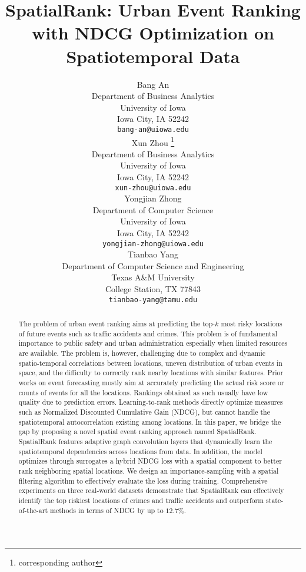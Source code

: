 \documentclass{article}
\title{SpatialRank: Urban Event Ranking with NDCG Optimization on Spatiotemporal Data}
\author{
  Bang An\\
  Department of Business Analytics\\
  University of Iowa\\
  Iowa City, IA 52242 \\
  \texttt{bang-an@uiowa.edu} \\
   \And
   Xun Zhou \thanks{corresponding author} \\
  Department of Business Analytics\\
  University of Iowa\\
  Iowa City, IA 52242 \\
  \texttt{xun-zhou@uiowa.edu} \\
   \AND
    Yongjian Zhong \\
  Department of Computer Science\\
  University of Iowa\\
  Iowa City, IA 52242 \\
  \texttt{yongjian-zhong@uiowa.edu} \\
   \And
  Tianbao Yang \\
  Department of Computer Science and Engineering\\
  Texas A\&M University\\
  College Station, TX 77843 \\
  \texttt{tianbao-yang@tamu.edu} 
}
\begin{document}
\maketitle


\begin{abstract}

The problem of urban event ranking aims at predicting the top-$k$ most risky locations of future events such as traffic accidents and crimes. This problem is of fundamental importance to public safety and urban administration especially when limited resources are available. The problem is, however, challenging due to complex and dynamic spatio-temporal correlations between locations, uneven distribution of urban events in space, and the difficulty to correctly rank nearby locations with similar features. 
%
Prior works on event forecasting mostly aim at accurately predicting the actual risk score or counts of events for all the locations. Rankings obtained as such usually have low quality due to prediction errors. Learning-to-rank methods directly optimize measures such as Normalized Discounted Cumulative Gain (NDCG), but cannot handle the spatiotemporal autocorrelation existing among locations. %
%
In this paper, we bridge the gap by proposing a novel spatial event ranking approach named SpatialRank. SpatialRank features adaptive graph convolution layers that dynamically learn the spatiotemporal dependencies across locations from data. In addition, the model optimizes through surrogates a hybrid NDCG loss with a spatial component to better rank neighboring spatial locations. We design an importance-sampling with a spatial filtering algorithm to effectively evaluate the loss during training. Comprehensive experiments on three real-world datasets demonstrate that SpatialRank can effectively identify the top riskiest locations of crimes and traffic accidents and outperform state-of-the-art methods in terms of NDCG by up to $12.7\%$. 


\end{abstract}
\end{document}
